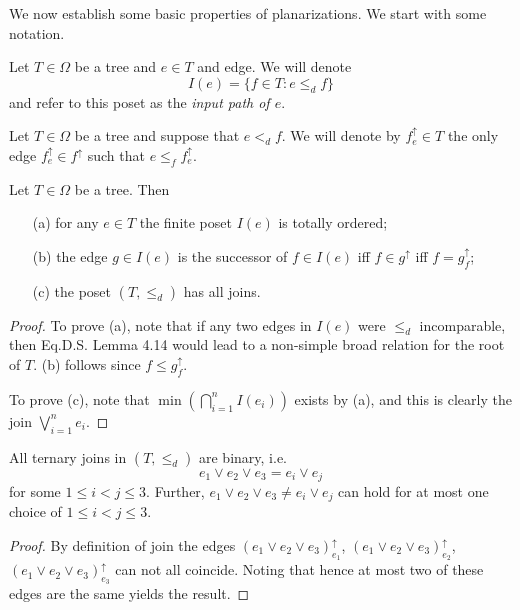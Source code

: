 \documentclass[a4paper,10pt]{article}%
\begin{document}
We now establish some basic properties of planarizations. We start with some notation.


\begin{notation}\label{INPUTPATH NOT}
	Let $T \in \Omega$ be a tree and $e \in T$ and edge. We will denote
	\[ I(e) =\{f \in T \colon e \leq_d f \} \]
and refer to this poset as the \textit{input path of $e$}.
\end{notation}

\begin{notation}
	Let $T \in \Omega$ be a tree and suppose that $e <_d f$. We will denote by $f^{\uparrow}_e \in T$ the only edge $f^{\uparrow}_e \in f^{\uparrow}$ such that 
	$e \leq_f f^{\uparrow}_e$.
\end{notation}


\begin{proposition}
	Let $T \in \Omega$ be a tree. Then
	\begin{itemize}
		\item[(a)] for any $e \in T$ the finite poset $I(e)$ is totally ordered;
		\item[(b)] the edge $g \in I(e)$ is the successor of 
		$f \in I(e)$ iff $f \in g^{\uparrow}$ iff $f=g^{\uparrow}_f$; 
		\item[(c)] the poset $(T,\leq_d)$ has all joins.
	\end{itemize}
\end{proposition}

\begin{proof}
	To prove (a), note that if any two edges in $I(e)$ were $\leq_d$ incomparable, then {\color{green} Eq.D.S. Lemma 4.14} would lead to a non-simple broad relation for the root of $T$.
	(b) follows since $f \leq g^{\uparrow}_f$.

	To prove (c), note that 
	$\min (\bigcap_{i=1}^n I(e_i))$ exists by (a), and this is clearly the join $\bigvee_{i=1}^n{e_i}$.
\end{proof}

\begin{proposition}
\label{TERNARYJOIN PROP}
All ternary joins in $(T,\leq_d)$ are binary, i.e.
\[ e_1 \vee e_2 \vee e_3 = e_i \vee e_j\]
for some $1\leq i <j \leq 3$. Further, $e_1 \vee e_2 \vee e_3 \neq e_i \vee e_j$ can hold for at most one choice of $1\leq i <j \leq 3$.
\end{proposition}

\begin{proof}
By definition of join the edges 
$(e_1 \vee e_2 \vee e_3)^\uparrow_{e_1}$, 
$(e_1 \vee e_2 \vee e_3)^\uparrow_{e_2}$, 
$(e_1 \vee e_2 \vee e_3)^\uparrow_{e_3}$
can not all coincide. Noting that hence at most two of these edges are the same yields the result.
\end{proof}
\end{document}
